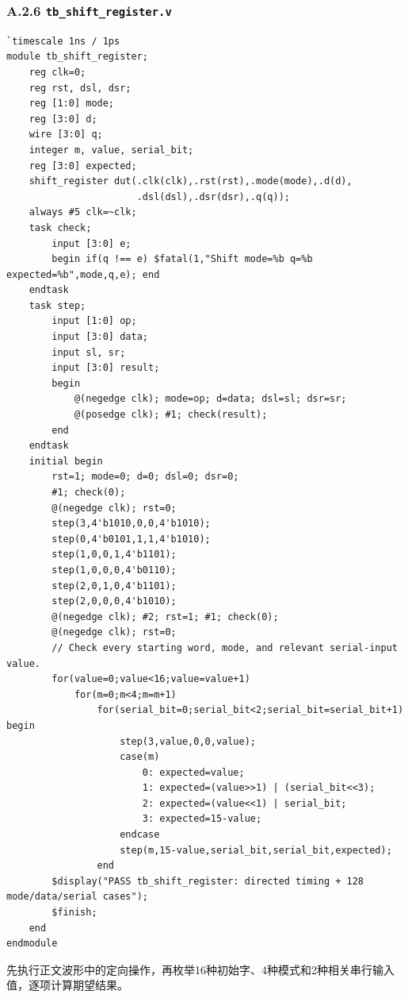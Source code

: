 \documentclass[12pt,a4paper]{ctexart}
\begin{document}
\subsubsection*{A.2.6 \texttt{tb\_shift\_register.v}}
\begin{lstlisting}
`timescale 1ns / 1ps
module tb_shift_register;
    reg clk=0;
    reg rst, dsl, dsr;
    reg [1:0] mode;
    reg [3:0] d;
    wire [3:0] q;
    integer m, value, serial_bit;
    reg [3:0] expected;
    shift_register dut(.clk(clk),.rst(rst),.mode(mode),.d(d),
                       .dsl(dsl),.dsr(dsr),.q(q));
    always #5 clk=~clk;
    task check;
        input [3:0] e;
        begin if(q !== e) $fatal(1,"Shift mode=%b q=%b expected=%b",mode,q,e); end
    endtask
    task step;
        input [1:0] op;
        input [3:0] data;
        input sl, sr;
        input [3:0] result;
        begin
            @(negedge clk); mode=op; d=data; dsl=sl; dsr=sr;
            @(posedge clk); #1; check(result);
        end
    endtask
    initial begin
        rst=1; mode=0; d=0; dsl=0; dsr=0;
        #1; check(0);
        @(negedge clk); rst=0;
        step(3,4'b1010,0,0,4'b1010);
        step(0,4'b0101,1,1,4'b1010);
        step(1,0,0,1,4'b1101);
        step(1,0,0,0,4'b0110);
        step(2,0,1,0,4'b1101);
        step(2,0,0,0,4'b1010);
        @(negedge clk); #2; rst=1; #1; check(0);
        @(negedge clk); rst=0;
        // Check every starting word, mode, and relevant serial-input value.
        for(value=0;value<16;value=value+1)
            for(m=0;m<4;m=m+1)
                for(serial_bit=0;serial_bit<2;serial_bit=serial_bit+1) begin
                    step(3,value,0,0,value);
                    case(m)
                        0: expected=value;
                        1: expected=(value>>1) | (serial_bit<<3);
                        2: expected=(value<<1) | serial_bit;
                        3: expected=15-value;
                    endcase
                    step(m,15-value,serial_bit,serial_bit,expected);
                end
        $display("PASS tb_shift_register: directed timing + 128 mode/data/serial cases");
        $finish;
    end
endmodule
\end{lstlisting}
先执行正文波形中的定向操作，再枚举16种初始字、4种模式和2种相关串行输入值，逐项计算期望结果。
\end{document}
